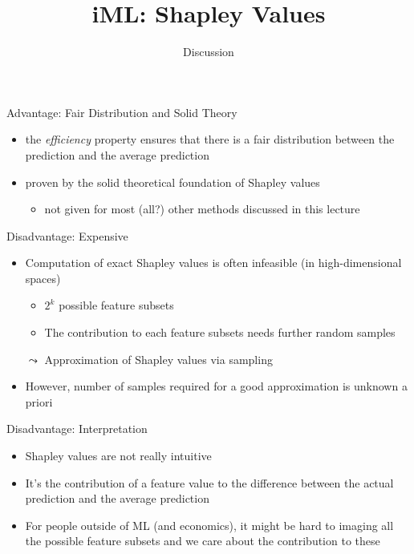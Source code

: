 \documentclass[aspectratio=169]{../latex_main/tntbeamer}  %
\title[Introduction]{iML: Shapley Values}
\subtitle{Discussion}
\begin{document}
	
	\maketitle
	
\begin{frame}{Advantage: Fair Distribution and Solid Theory}
    
    \begin{itemize}
        \item the \emph{efficiency} property ensures that there is a fair distribution between the prediction and the average prediction 
        \item proven by the solid theoretical foundation of Shapley values 
        \begin{itemize}
            \item not given for most (all?) other methods discussed in this lecture
        \end{itemize}
    \end{itemize}
    
\end{frame}

	
\begin{frame}{Disadvantage: Expensive}
    
    \begin{itemize}
        \item Computation of exact Shapley values is often infeasible (in high-dimensional spaces)
        \begin{itemize}
            \item $2^k$ possible feature subsets
            \item The contribution to each feature subsets needs further random samples
        \end{itemize}
        \pause
        \bigskip
        \item[$\leadsto$] Approximation of Shapley values via sampling
        \item However, number of samples required for a good approximation is unknown a priori
    \end{itemize}
    
\end{frame}

\begin{frame}{Disadvantage: Interpretation}
    
    \begin{itemize}
        \item Shapley values are not really intuitive
        \item It's the contribution of a feature value to the difference between the actual prediction and the average prediction
        \item For people outside of ML (and economics), it might be hard to imaging all the possible feature subsets and we care about the contribution to these
    \end{itemize}
    
\end{frame}
\end{document}
